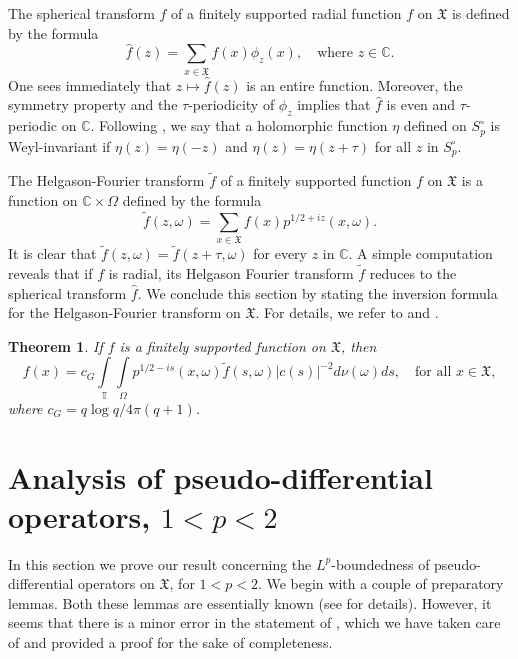 \documentclass[12pt,reqno]{amsart}
\newcommand{\C}{\mathbb C}
\newcommand{\T}{\mathbb{T}}
\newtheorem{theorem}{Theorem}[section]
\theoremstyle{definition}
\theoremstyle{definition}
\numberwithin{equation}{section}
\begin{document}
The spherical transform $\widehat{f}$ of a finitely supported radial function $f$ on $\mathfrak{X} $ is defined by the formula
$$\widehat{f}(z)=\sum\limits_{x\in\mathfrak{X}}f(x)\phi_z(x),\quad \text{where } z\in\C.$$
One sees immediately that $z\mapsto\widehat{f}(z)$ is an entire function. Moreover, the symmetry property and the $\tau$-periodicity of $\phi_{z}$ implies that $\widehat{f}$ is even and $\tau$-periodic on $\mathbb{C}$. Following \cite{Meda_Stefano_2019}, we say that a holomorphic function $\eta$ defined on $S^{\circ}_{p}$ is Weyl-invariant if $\eta(z)=\eta(-z)$ and $\eta(z)=\eta(z+\tau)$ for all $z$ in $S^{\circ}_{p}$.

The Helgason-Fourier transform $\widetilde{f} $ of a finitely supported function $f$ on $\mathfrak{X}$ is a function on $\C\times\Omega$ defined by the formula
$$\widetilde{f} (z,\omega)=\sum\limits_{x\in\mathfrak{X}}f(x)p^{1/2+iz}(x,\omega).$$
It is clear that $\widetilde{f}(z,\omega)=\widetilde{f}(z+\tau,\omega)$ for every $z$ in $\mathbb{C}$. A simple computation reveals that if $f$ is radial, its Helgason Fourier transform $\widetilde{f}$ reduces to the spherical transform $\widehat{f}$. We conclude this section by stating the inversion formula for the Helgason-Fourier transform on $\mathfrak{X}$. For details, we refer to \cite[Chapter 3, Section IV and Chapter 5, Section IV]{Talamanca_Picardello_1983} and \cite[Chapter II, Section 6]{Alessandro_Nebbia}.

\begin{theorem}
If $f$ is a finitely supported function on $\mathfrak{X}$, then 
$$ f(x) = c_G\int\limits_{\T}\int\limits_{\Omega}p^{1/2-is}(x,\omega)  \widetilde{f} (s,\omega) |c(s)|^{-2} d\nu(\omega) ds,\quad\text{for all }x\in\mathfrak{X},$$
where $c_{G}=q\log q/4\pi(q+1)$.
\end{theorem}

\section{Analysis of pseudo-differential operators, \texorpdfstring{$1<p<2$}{1p2}}\label{PDO_on_tree_1<p<2}
In this section we prove our result concerning the $L^{p}$-boundedness of pseudo-differential operators on $\mathfrak{X}$, for $1<p<2$. We begin with a couple of preparatory lemmas. Both these lemmas are essentially known (see \cite[Lemma 2.2 $\&$ 2.3]{Meda_Stefano_2019} for details). However, it seems that there is a minor error in the statement of \cite[Lemma 2.2]{Meda_Stefano_2019}, which we have taken care of and provided a proof for the sake of completeness.
\end{document}
